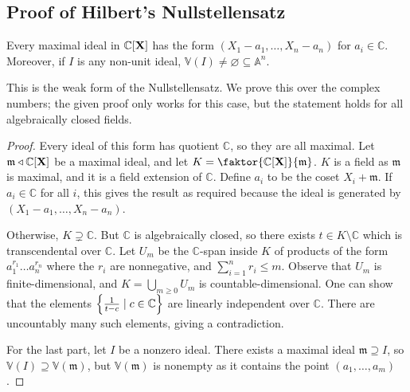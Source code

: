 \subsection{Proof of Hilbert's Nullstellensatz}
\begin{theorem}
    Every maximal ideal in \( \mathbb C[\vb X] \) has the form \( (X_1 - a_1, \dots, X_n - a_n) \) for \( a_i \in \mathbb C \).
    Moreover, if \( I \) is any non-unit ideal, \( \mathbb V(I) \neq \varnothing \subseteq \mathbb A^n \).
\end{theorem}
This is the weak form of the Nullstellensatz.
We prove this over the complex numbers; the given proof only works for this case, but the statement holds for all algebraically closed fields.
\begin{proof}
    Every ideal of this form has quotient \( \mathbb C \), so they are all maximal.
    Let \( \mathfrak m \triangleleft \mathbb C[\vb X] \) be a maximal ideal, and let \( K = \faktor{\mathbb C[\vb X]}{\mathfrak m} \).
    \( K \) is a field as \( \mathfrak m \) is maximal, and it is a field extension of \( \mathbb C \).
    Define \( a_i \) to be the coset \( X_i + \mathfrak m \).
    If \( a_i \in \mathbb C \) for all \( i \), this gives the result as required because the ideal is generated by \( (X_1 - a_1, \dots, X_n - a_n) \).
    
    Otherwise, \( K \supsetneq \mathbb C \).
    But \( \mathbb C \) is algebraically closed, so there exists \( t \in K \setminus \mathbb C \) which is transcendental over \( \mathbb C \).
    Let \( U_m \) be the \( \mathbb C \)-span inside \( K \) of products of the form \( a_1^{r_1} \dots a_n^{r_n} \) where the \( r_i \) are nonnegative, and \( \sum_{i=1}^n r_i \leq m \).
    Observe that \( U_m \) is finite-dimensional, and \( K = \bigcup_{m \geq 0} U_m \) is countable-dimensional.
    One can show that the elements \( \qty{\frac{1}{t - c} \mid c \in \mathbb C} \) are linearly independent over \( \mathbb C \).
    There are uncountably many such elements, giving a contradiction.

    For the last part, let \( I \) be a nonzero ideal.
    There exists a maximal ideal \( \mathfrak m \supseteq I \), so \( \mathbb V(I) \supseteq \mathbb V(\mathfrak m) \), but \( \mathbb V(\mathfrak m) \) is nonempty as it contains the point \( (a_1, \dots, a_m) \).
\end{proof}

